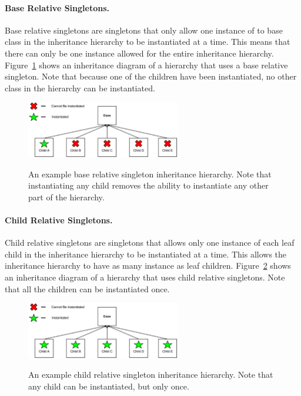 \documentclass[12pt]{ucthesis}
\newcommand{\captionfonts}{\small\bf\ssp}
\begin{document}
\paragraph{Base Relative Singletons.}
Base relative singletons are singletons that only allow one instance of to base class in the inheritance hierarchy to be instantiated
at a time. This means that there can only be one instance allowed for the entire inheritance hierarchy.
Figure~\ref{fig:baseSingleton} shows an inheritance diagram of a hierarchy that uses a base relative singleton.
Note that because one of the children have been instantiated, no other class in the hierarchy can be instantiated.

\begin{figure}[H]
   \begin{center}
      \includegraphics[width=0.6\textwidth]{images/Base_Singleton.eps}
      \captionfonts
      \caption[Base Relative Singleton]{An example base relative singleton inheritance hierarchy. Note that instantiating any child removes the ability to instantiate any other part of the hierarchy.}
      \label{fig:baseSingleton}
   \end{center}
\end{figure}

\paragraph{Child Relative Singletons.}
Child relative singletons are singletons that allows only one instance of each leaf child in the inheritance hierarchy to be instantiated
at a time. This allows the inheritance hierarchy to have as many instance as leaf children.
Figure~\ref{fig:childSingleton} shows an inheritance diagram of a hierarchy that uses child relative singletons.
Note that all the children can be instantiated once.

\begin{figure}[H]
   \begin{center}
      \includegraphics[width=0.6\textwidth]{images/Child_Singleton.eps}
      \captionfonts
      \caption[Child Relative Singleton]{An example child relative singleton inheritance hierarchy. Note that any child can be instantiated, but only once.}
      \label{fig:childSingleton}
   \end{center}
\end{figure}
\end{document}
